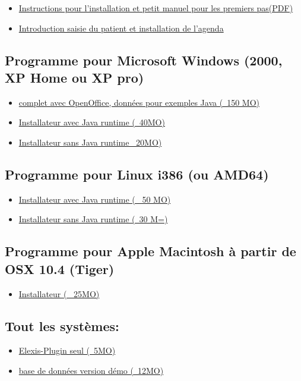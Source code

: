 \begin{itemize}
 \item \href{http://www.elexis.ch/files/erste_schritte.pdf}{Instructions pour l'installation et petit  manuel pour les premiers pas(PDF)}
\item \href{http://www.elexis.ch/files/pat_agenda.pdf}{Introduction saisie du patient et installation de l'agenda}
\end{itemize}

\subsection{Programme pour Microsoft Windows (2000, XP Home ou XP pro)}
\begin{itemize}
\item \href{http://www.elexis.ch/download.php?file=demo}{complet avec OpenOffice, données pour exemples Java (~150 MO)}
\item \href{http://www.rgw.ch/download.php?file=elexis-jre-win32}{Installateur avec Java runtime (~40MO)}
\item \href{http://www.rgw.ch/download.php?file=elexis-win32}{Installateur sans Java runtime ~20MO)}
\end{itemize}

\subsection{Programme pour Linux i386 (ou AMD64)}
\begin{itemize}
 \item \href{http://www.elexis.ch/download.php?file=elexis-linux-jre-i386}{Installateur avec Java runtime ( ~50 MO)}
\item \href{http://www.elexis.ch/download.php?file=elexis-linux-i386}{Installateur sans Java runtime (~30 M=)}
\end{itemize}

\subsection{Programme pour Apple Macintosh à partir de OSX 10.4 (Tiger)}
\begin{itemize}
 \item \href{http://www.elexis.ch/download.php?file=elexis-mac}{Installateur (~ 25MO)}
\end{itemize}

\subsection{Tout les systèmes:}
\begin{itemize}
 \item \href{http://www.elexis.ch/download.php?file=elexis-plugin}{Elexis-Plugin seul (~5MO)}
\item \href{http://www.elexis.ch/download.php?file=demodaten.zip}{base de données version démo  (~12MO) }
\end{itemize}

